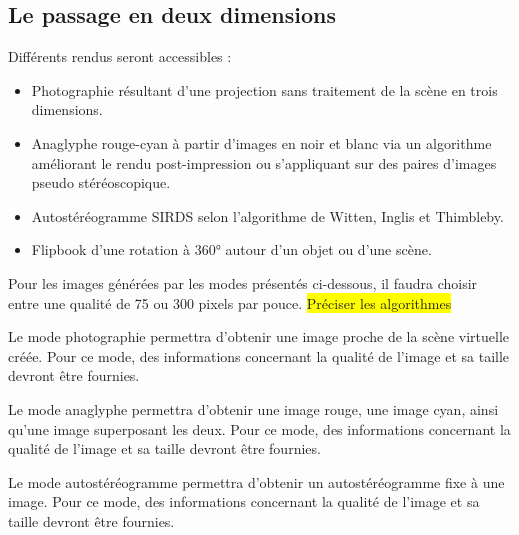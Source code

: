 \subsection{Le passage en deux dimensions}
\begin{description}[style=nextline]
	\item[Mode de passage en deux dimensions]
	Différents rendus seront accessibles : 
	\begin{itemize}
			\item Photographie résultant d'une projection sans traitement de la scène en trois dimensions.
			\item Anaglyphe rouge-cyan à partir d'images en noir et blanc via un algorithme améliorant le rendu post-impression ou s’appliquant sur des paires d’images pseudo stéréoscopique.
                        \item Autostéréogramme SIRDS selon l'algorithme de Witten, Inglis et Thimbleby.
                        \item Flipbook d'une rotation à 360° autour d'un objet ou d'une scène.
	\end{itemize}
	Pour les images générées par les modes présentés ci-dessous, il faudra choisir entre une qualité de 75 ou 300 pixels par pouce. \colorbox{yellow}{Préciser les algorithmes} 
	
	\item[Mode photographie]
	\mbox{\hspace{1cm}} Le mode photographie permettra d’obtenir une image proche de la scène virtuelle créée. Pour ce mode, des informations concernant la qualité de l’image et sa taille devront être fournies.
	
	\item[Mode analgyphe]	
	\mbox{\hspace{1cm}}Le mode anaglyphe permettra d’obtenir une image rouge, une image cyan, ainsi qu’une image superposant les deux. Pour ce mode, des informations concernant la qualité de l’image et sa taille devront être fournies.
	
	\item[Mode autostéréogramme]	
	\mbox{\hspace{1cm}}Le mode autostéréogramme permettra d’obtenir un autostéréogramme fixe à une image. Pour ce mode, des informations concernant la qualité de l’image et sa taille devront être fournies.
	

\end{description}
